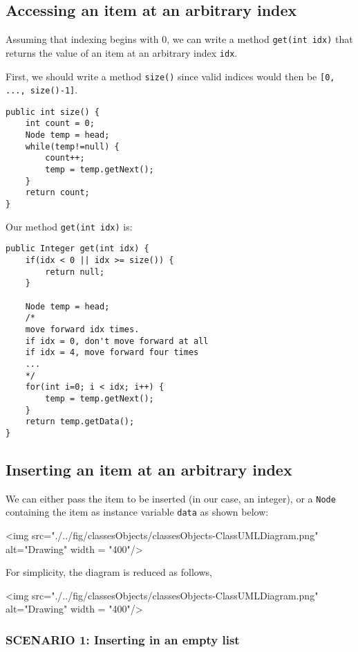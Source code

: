 \newpage

\subsection{Accessing an item at an arbitrary index}

Assuming that indexing begins with 0, we can write a method \texttt{get(int idx)} that returns the value of an item at an arbitrary index \texttt{idx}.

First, we should write a method \texttt{size()} since valid indices would then be \texttt{[0, ..., size()-1]}.

\begin{lstlisting}
public int size() {
	int count = 0;
	Node temp = head;
	while(temp!=null) {
		count++;
		temp = temp.getNext();
	}
	return count;
}
\end{lstlisting}

Our method \texttt{get(int idx)} is:

\begin{lstlisting}
public Integer get(int idx) {
	if(idx < 0 || idx >= size()) {
		return null;
	}
	
	Node temp = head;
	/*
	move forward idx times. 
	if idx = 0, don't move forward at all
	if idx = 4, move forward four times
	...
	*/
	for(int i=0; i < idx; i++) {
		temp = temp.getNext();
	}
	return temp.getData();
}
\end{lstlisting}

\subsection{Inserting an item at an arbitrary index}

We can either pass the item to be inserted (in our case, an integer), or a \texttt{Node} containing the item as instance variable \texttt{data} as shown below:

\vskip 0.5cm

<img src="./../fig/classesObjects/classesObjects-ClassUMLDiagram.png" alt="Drawing" width = "400"/>

\vskip 0.5cm

For simplicity, the diagram is reduced as follows,

\vskip 0.5cm

<img src="./../fig/classesObjects/classesObjects-ClassUMLDiagram.png" alt="Drawing" width = "400"/>
 
\subsubsection{SCENARIO 1: Inserting in an empty list}

